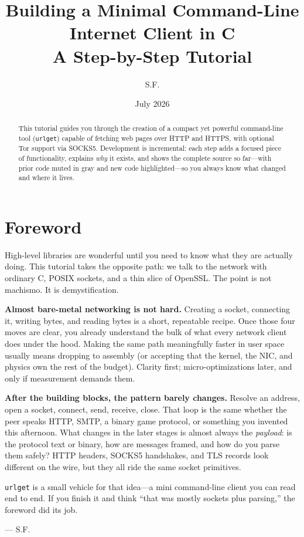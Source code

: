 \documentclass[11pt,a4paper]{article}
\title{\textbf{Building a Minimal Command-Line Internet Client in C}\\[0.4em]
\large A Step-by-Step Tutorial}
\author{S.F.}
\date{July 2026}
\begin{document}
\maketitle

\begin{abstract}
This tutorial guides you through the creation of a compact yet powerful
command-line tool (\texttt{urlget}) capable of fetching web pages over HTTP
and HTTPS, with optional Tor support via SOCKS5. Development is incremental:
each step adds a focused piece of functionality, explains \emph{why} it exists,
and shows the complete source so far---with prior code muted in gray and new
code highlighted---so you always know what changed and where it lives.
\end{abstract}

\section*{Foreword}

High-level libraries are wonderful until you need to know what they are
actually doing. This tutorial takes the opposite path: we talk to the network
with ordinary C, POSIX sockets, and a thin slice of OpenSSL. The point is not
machismo. It is demystification.

\textbf{Almost bare-metal networking is not hard.} Creating a socket,
connecting it, writing bytes, and reading bytes is a short, repeatable recipe.
Once those four moves are clear, you already understand the bulk of what every
network client does under the hood. Making the same path meaningfully faster
in user space usually means dropping to assembly (or accepting that the kernel,
the NIC, and physics own the rest of the budget). Clarity first; micro-optimizations
later, and only if measurement demands them.

\textbf{After the building blocks, the pattern barely changes.} Resolve an
address, open a socket, connect, send, receive, close. That loop is the same
whether the peer speaks HTTP, SMTP, a binary game protocol, or something you
invented this afternoon. What changes in the later stages is almost always the
\emph{payload}: is the protocol text or binary, how are messages framed, and
how do you parse them safely? HTTP headers, SOCKS5 handshakes, and TLS records
look different on the wire, but they all ride the same socket primitives.

\texttt{urlget} is a small vehicle for that idea---a mini command-line client
you can read end to end. If you finish it and think ``that was mostly sockets
plus parsing,'' the foreword did its job.

\hfill--- S.F.

\tableofcontents
\newpage












\end{document}
